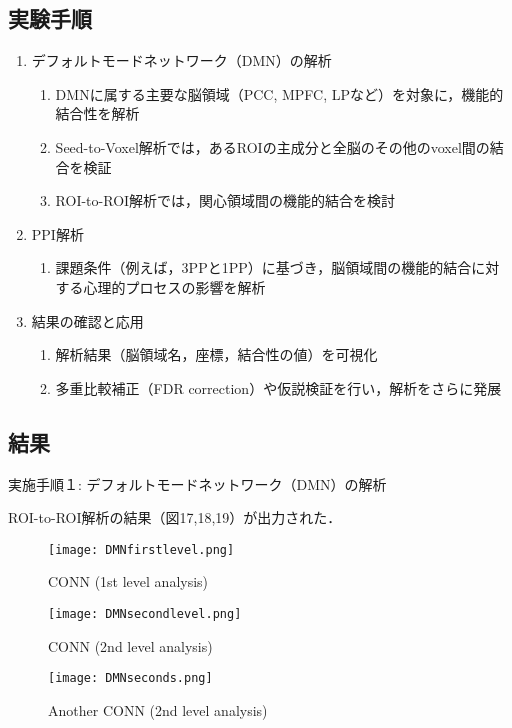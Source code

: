 \documentclass{jlreq}
\begin{document}
\subsection{実験手順}
\begin{enumerate}
    \item デフォルトモードネットワーク（DMN）の解析
    \begin{enumerate}
        \item DMNに属する主要な脳領域（PCC, MPFC, LPなど）を対象に，機能的結合性を解析
        \item Seed-to-Voxel解析では，あるROIの主成分と全脳のその他のvoxel間の結合を検証
        \item ROI-to-ROI解析では，関心領域間の機能的結合を検討
    \end{enumerate}

    \item PPI解析 
    \begin{enumerate}
        \item 課題条件（例えば，3PPと1PP）に基づき，脳領域間の機能的結合に対する心理的プロセスの影響を解析
    \end{enumerate}

    \item 結果の確認と応用
    \begin{enumerate}
        \item 解析結果（脳領域名，座標，結合性の値）を可視化
        \item 多重比較補正（FDR correction）や仮説検証を行い，解析をさらに発展
    \end{enumerate}
\end{enumerate}
\subsection{結果}

実施手順１: デフォルトモードネットワーク（DMN）の解析  

ROI-to-ROI解析の結果（図17,18,19）が出力された．


\begin{figure}[H]
    \centering
        \begin{minipage}{0.25\textwidth}
        \centering
        \texttt{[image: DMNfirstlevel.png]}
        \caption{CONN (1st level analysis)}
        \label{fig:brain_T1}
    \end{minipage}
    \hfill
    \begin{minipage}{0.2\textwidth}
        \centering
        \texttt{[image: DMNsecondlevel.png]}
        \caption{CONN (2nd level analysis)}
        \label{fig:brain_T1}
    \end{minipage}
    \hfill
    \begin{minipage}{0.2\textwidth}
        \centering
        \texttt{[image: DMNseconds.png]}
        \caption{Another CONN (2nd level analysis)}
        \label{fig:brain_EPI}
    \end{minipage}
\end{figure}
\end{document}
